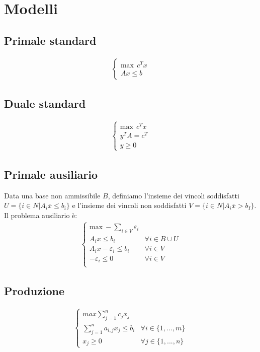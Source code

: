 \documentclass[fleqn,12pt]{article}
\begin{document}
\section{Modelli}
\subsection{Primale standard}
    \begin{gather*}
    \begin{cases}
        \text{max} \ \ c^Tx \\
        Ax \le b
    \end{cases}
    \end{gather*}

\subsection{Duale standard}
    \begin{gather*}
    \begin{cases}
        \text{max} \ \ c^Tx \\
        y^TA=c^T \\
        y \ge 0
    \end{cases}
    \end{gather*}

\subsection{Primale ausiliario}
Data una base non ammissibile $B$, definiamo l'insieme dei vincoli soddisfatti
$U = \{i \in N | A_i\bar{x} \le b_i\}$ e l'insieme dei vincoli non soddisfatti
$V = \{i \in N | A_i\bar{x} > b_I\}$. Il problema ausiliario è: \\
    \begin{gather*}
    \begin{cases}
        \text{max} \ -\sum\limits_{i \in V} \varepsilon_i \\
        A_ix \le b_i & \forall i \in B \cup U \\
        A_ix - \varepsilon_i \le b_i & \forall i \in V \\
        -\varepsilon_i \le 0 & \forall i \in V \\
    \end{cases}
    \end{gather*}

\subsection{Produzione}
    \begin{gather*}
    \begin{cases}
        max \sum\limits_{j=1}^{n} c_jx_j \\
        \sum\limits_{j=1}^n a_{i,j}x_j \le b_i & \forall i \in \{1,...,m\} \\
        x_j \ge 0 & \forall j \in \{1,...,n\}
    \end{cases}
    \end{gather*}
\end{document}
